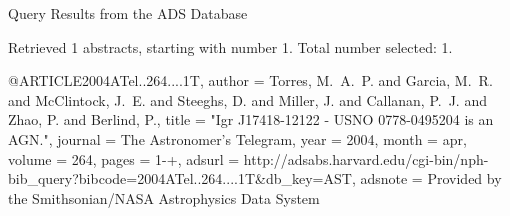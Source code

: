 Query Results from the ADS Database


Retrieved 1 abstracts, starting with number 1.  Total number selected: 1.

@ARTICLE{2004ATel..264....1T,
   author = {{Torres}, M.~A.~P. and {Garcia}, M.~R. and {McClintock}, J.~E. and 
	{Steeghs}, D. and {Miller}, J. and {Callanan}, P.~J. and {Zhao}, P. and 
	{Berlind}, P.},
    title = "{Igr J17418-12122 - USNO 0778-0495204 is an AGN.}",
  journal = {The Astronomer's Telegram},
     year = 2004,
    month = apr,
   volume = 264,
    pages = {1-+},
   adsurl = {http://adsabs.harvard.edu/cgi-bin/nph-bib_query?bibcode=2004ATel..264....1T&db_key=AST},
  adsnote = {Provided by the Smithsonian/NASA Astrophysics Data System}
}



